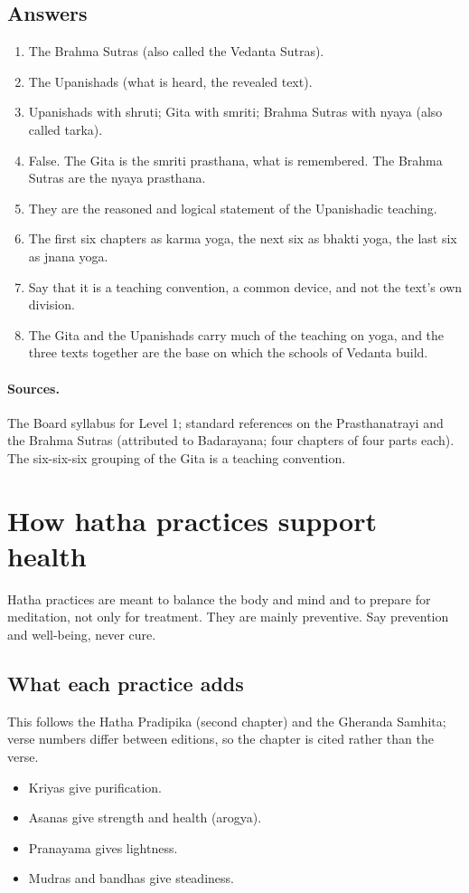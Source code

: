 \subsection*{Answers}
\begin{enumerate}
\item The Brahma Sutras (also called the Vedanta Sutras).
\item The Upanishads (what is heard, the revealed text).
\item Upanishads with shruti; Gita with smriti; Brahma Sutras with nyaya (also called tarka).
\item False. The Gita is the smriti prasthana, what is remembered. The Brahma Sutras are the nyaya prasthana.
\item They are the reasoned and logical statement of the Upanishadic teaching.
\item The first six chapters as karma yoga, the next six as bhakti yoga, the last six as jnana yoga.
\item Say that it is a teaching convention, a common device, and not the text's own division.
\item The Gita and the Upanishads carry much of the teaching on yoga, and the three texts together are the base on which the schools of Vedanta build.
\end{enumerate}

\paragraph{Sources.} The Board syllabus for Level 1; standard references on the Prasthanatrayi and the Brahma Sutras (attributed to Badarayana; four chapters of four parts each). The six-six-six grouping of the Gita is a teaching convention.

\section{How hatha practices support health}
\label{sec:hatha-practices-health}

Hatha practices are meant to balance the body and mind and to prepare for meditation, not only for treatment. They are mainly preventive. Say prevention and well-being, never cure.

\subsection*{What each practice adds}
This follows the Hatha Pradipika (second chapter) and the Gheranda Samhita; verse numbers differ between editions, so the chapter is cited rather than the verse.
\begin{itemize}
\item Kriyas give purification.
\item Asanas give strength and health (arogya).
\item Pranayama gives lightness.
\item Mudras and bandhas give steadiness.
\end{itemize}

